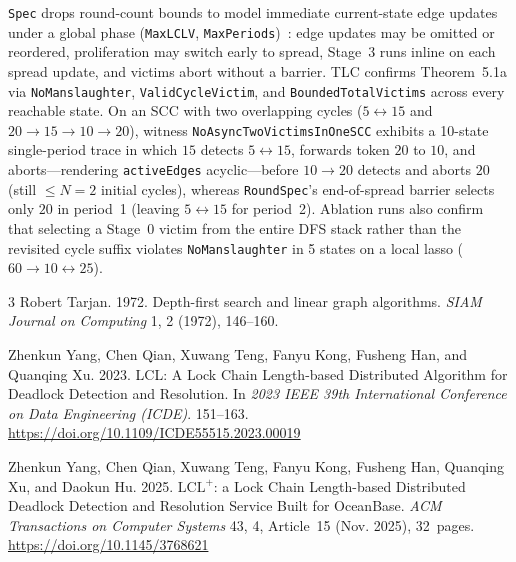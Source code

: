 \documentclass[sigconf,nonacm]{acmart}
\begin{document}
\texttt{Spec} drops round-count bounds to model immediate current-state
edge updates under a global phase (\texttt{MaxLCLV},
\texttt{MaxPeriods})~\cite[\S4.6]{lclplus}: edge updates may be omitted
or reordered, proliferation may switch early to spread, Stage~3 runs
inline on each spread update, and victims abort without a barrier. TLC
confirms Theorem~5.1a via \texttt{NoManslaughter},
\texttt{ValidCycleVictim}, and \texttt{BoundedTotalVictims} across every
reachable state. On an SCC with two overlapping cycles
(\(5\leftrightarrow 15\) and \(20\to 15\to 10\to 20\)), witness
\texttt{NoAsyncTwoVictimsInOneSCC} exhibits a 10-state single-period
trace in which \(15\) detects \(5\leftrightarrow 15\), forwards token
\(20\) to \(10\), and aborts---rendering \texttt{activeEdges}
acyclic---before \(10\to 20\) detects and aborts \(20\) (still \(\le
N=2\) initial cycles), whereas \texttt{RoundSpec}'s end-of-spread
barrier selects only \(20\) in period~1 (leaving \(5\leftrightarrow 15\)
for period~2). Ablation runs also confirm that selecting a Stage~0
victim from the entire DFS stack rather than the revisited cycle suffix
violates \texttt{NoManslaughter} in 5 states on a local lasso
(\(60\to 10\leftrightarrow 25\)).
\par\endgroup

\begin{thebibliography}{3}
Robert Tarjan. 1972.
\newblock Depth-first search and linear graph algorithms.
\newblock \emph{SIAM Journal on Computing} 1, 2 (1972), 146--160.

Zhenkun Yang, Chen Qian, Xuwang Teng, Fanyu Kong, Fusheng Han, and
Quanqing Xu. 2023.
\newblock LCL: A Lock Chain Length-based Distributed Algorithm for
Deadlock Detection and Resolution.
\newblock In \emph{2023 IEEE 39th International Conference on Data
Engineering (ICDE)}. 151--163.
\newblock \url{https://doi.org/10.1109/ICDE55515.2023.00019}

Zhenkun Yang, Chen Qian, Xuwang Teng, Fanyu Kong, Fusheng Han,
Quanqing Xu, and Daokun Hu. 2025.
\newblock \(\text{LCL}^+\): a Lock Chain Length-based Distributed
Deadlock Detection and Resolution Service Built for OceanBase.
\newblock \emph{ACM Transactions on Computer Systems} 43, 4, Article~15
(Nov. 2025), 32~pages.
\newblock \url{https://doi.org/10.1145/3768621}
\end{thebibliography}
\end{document}
